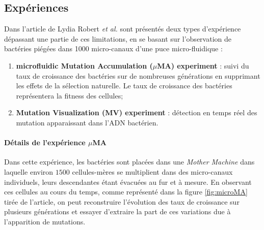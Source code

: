 \documentclass[12pt]{article}
\begin{document}
\subsection{Expériences}

Dans l'article de Lydia Robert \textit{et al.} \cite{rob} sont présentés deux types d'expérience dépassant une partie de ces limitations, en se basant sur l'observation de bactéries piégées dans 1000 micro-canaux d'une puce micro-fluidique :
\begin{enumerate}
\item \textbf{microfluidic Mutation Accumulation ($\mu$MA) experiment} : suivi du taux de croissance des bactéries sur de nombreuses générations en supprimant les effets de la sélection naturelle. Le taux de croissance des bactéries représentera la fitness des cellules;
\item \textbf{Mutation Visualization (MV) experiment} : détection en temps réel des mutation apparaissant dans l'ADN bactérien.
\end{enumerate}

\paragraph{Détails de l'expérience $\mu$MA}

Dans cette expérience, les bactéries sont placées dans une \emph{Mother Machine} dans laquelle environ $1500$ cellules-mères se multiplient dans des micro-canaux individuels, leurs descendantes étant évacuées au fur et à mesure. En observant ces cellules au cours du temps, comme représenté dans la figure \ref{fig:microMA} tirée de l'article, on peut reconstruire l'évolution des taux de croissance sur plusieurs générations et essayer d'extraire la part de ces variations due à l'apparition de mutations.
\end{document}
